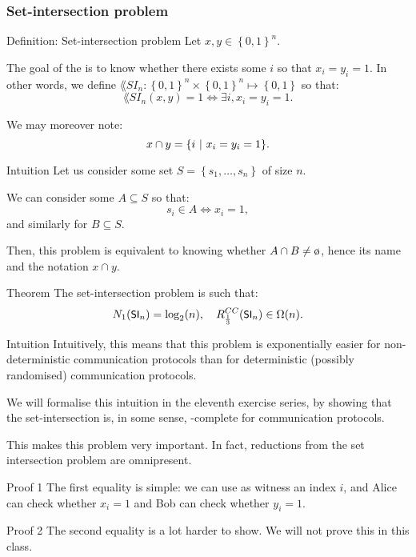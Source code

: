 \documentclass[a4paper]{article}
\begin{document}
\subsubsection{Set-intersection problem}

\begin{parag}{Definition: Set-intersection problem}
    Let $x, y \in \left\{0, 1\right\}^n$. 

    The goal of the  is to know whether there exists some $i$ so that $x_i = y_i = 1$. In other words, we define $\lang{SI}_n: \left\{0, 1\right\}^n \times \left\{0, 1\right\}^n \mapsto \left\{0 ,1\right\}$ so that: 
    \[\lang{SI}_n\left(x, y\right) = 1 \iff \exists i, x_i = y_i = 1.\]
    
    We may moreover note: 
    \[x \cap y = \left\{i \suchthat x_i = y_i = 1\right\}.\]

    \begin{subparag}{Intuition}
        Let us consider some set $S = \left\{s_1, \ldots, s_n\right\}$ of size $n$.

        We can consider some $A \subseteq S$ so that: 
        \[s_i \in A \iff x_i = 1,\]
        and similarly for $B \subseteq S$.

        Then, this problem is equivalent to knowing whether $A \cap B \neq \o$, hence its name and the notation $x \cap y$.
    \end{subparag}
\end{parag}

\begin{parag}{Theorem}
    The set-intersection problem is such that: 
    \[N_1\left(\lang{SI}_n\right) = \log_2\left(n\right), \mathspace R_{\frac{1}{3}}^{CC}\left(\lang{SI}_n\right) \in \Omega\left(n\right).\]

    \begin{subparag}{Intuition}
        Intuitively, this means that this problem is exponentially easier for non-deterministic communication protocols than for deterministic (possibly randomised) communication protocols. 

        We will formalise this intuition in the eleventh exercise series, by showing that the set-intersection is, in some sense, -complete for communication protocols.

        This makes this problem very important. In fact, reductions from the set intersection problem are omnipresent.
    \end{subparag}

    \begin{subparag}{Proof 1}
        The first equality is simple: we can use as witness an index $i$, and Alice can check whether $x_i = 1$ and Bob can check whether $y_i = 1$.
    \end{subparag}

    \begin{subparag}{Proof 2}
        The second equality is a lot harder to show. We will not prove this in this class.
    \end{subparag}
\end{parag}
\end{document}
